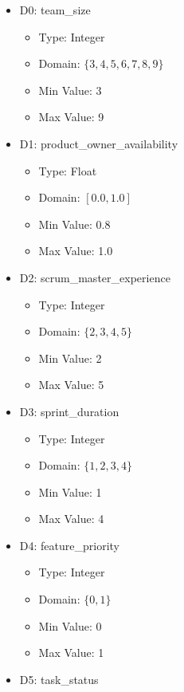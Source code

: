\documentclass{article}
\begin{document}
\begin{itemize}
    \item D0: team\_size
        \begin{itemize}
            \item Type: Integer
            \item Domain: $\{3, 4, 5, 6, 7, 8, 9\}$
            \item Min Value: 3
            \item Max Value: 9
        \end{itemize}
    \item D1: product\_owner\_availability
        \begin{itemize}
            \item Type: Float
            \item Domain: $[0.0, 1.0]$
            \item Min Value: 0.8
            \item Max Value: 1.0
        \end{itemize}
    \item D2: scrum\_master\_experience
        \begin{itemize}
            \item Type: Integer
            \item Domain: $\{2, 3, 4, 5\}$
            \item Min Value: 2
            \item Max Value: 5
        \end{itemize}
    \item D3: sprint\_duration
        \begin{itemize}
            \item Type: Integer
            \item Domain: $\{1, 2, 3, 4\}$
            \item Min Value: 1
            \item Max Value: 4
        \end{itemize}
    \item D4: feature\_priority
        \begin{itemize}
            \item Type: Integer
            \item Domain: $\{0, 1\}$
            \item Min Value: 0
            \item Max Value: 1
        \end{itemize}
    \item D5: task\_status

\end{itemize}
\end{document}
